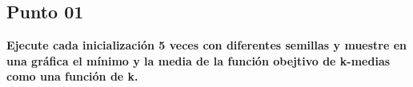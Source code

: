\subsection*{Punto 01}

\textbf{Ejecute cada inicialización 5 veces con diferentes semillas y muestre en una gráfica el mínimo y la media de la función obejtivo de k-medias como una función de k.}